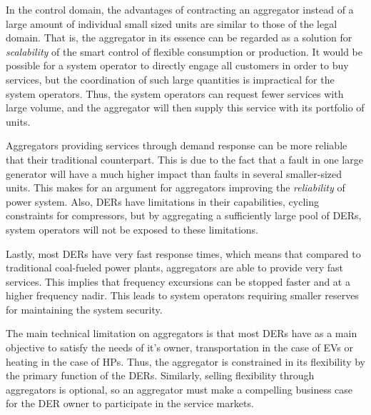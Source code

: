 In the control domain, the advantages of contracting an aggregator instead of a large amount of individual small sized units are similar to those of the legal domain. That is, the aggregator in its essence can be regarded as a solution for \emph{scalability} of the smart control of flexible consumption or production. It would be possible for a system operator to directly engage all customers in order to buy services, but the coordination of such large quantities is impractical for the system operators. Thus, the system operators can request fewer services with large volume, and the aggregator will then supply this service with its portfolio of units.

Aggregators providing services through demand response can be more reliable that their traditional counterpart. This is due to the fact that a fault in one large generator will have a much higher impact than faults in several smaller-sized units. This makes for an argument for aggregators improving the \emph{reliability} of power system. Also, DERs have limitations in their capabilities, \eg cycling constraints for compressors, but by aggregating a sufficiently large pool of DERs, system operators will not be exposed to these limitations. 

Lastly, most DERs have very fast response times, which means that compared to traditional coal-fueled power plants, aggregators are able to provide very fast services. This implies that frequency excursions can be stopped faster and at a higher frequency nadir. This leads to system operators requiring smaller reserves for maintaining  the system security.

The main technical limitation on aggregators is that most DERs have as a main objective to satisfy the needs of it's owner, \eg transportation in the case of EVs or heating in the case of HPs. Thus, the aggregator is constrained in its flexibility by the primary function of the DERs. Similarly, selling flexibility through aggregators is optional, so an aggregator must make a compelling business case for the DER owner to participate in the service markets.

